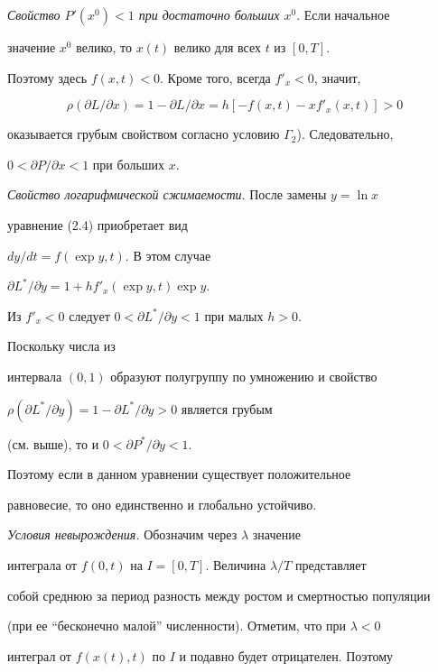  


{\it Свойство $P'(x^0)<1$ при достаточно больших $x^0$}. Если начальное 


значение $x^0$ велико, то $x(t)$ велико для всех $t$ из $[0,T]$. 


Поэтому здесь $f(x,t)<0$. Кроме того, всегда $f'_x<0$, значит, 


$$ 


\rho(\partial L/\partial x)=1-\partial L/\partial x=h[-f(x,t)-x 


f'_x(x,t)]>0 


$$ 


оказывается грубым свойством согласно условию $\Gamma_2$). Следовательно, 


$0<\partial P/\partial x<1$ при больших $x$. 


 


{\it Свойство логарифмической сжимаемости}. После замены $y=\ln x$ 


уравнение (2.4) приобретает вид


$d y/d t=f(\exp y,t)$. В этом случае 


$\partial L^*/\partial y=1+h f'_x(\exp y,t)\exp y$. 


Из $f'_x<0$ следует $0<\partial L^*/\partial y<1$ при малых $h>0$. 


Поскольку числа из 


интервала $(0,1)$ образуют полугруппу по умножению и свойство 


$\rho(\partial L^*/\partial y)=1-\partial L^*/\partial y>0$ является грубым


(см. выше), то и $0<\partial P^*/\partial y<1$. 


Поэтому если в данном уравнении существует положительное 


равновесие, то оно единственно и глобально устойчиво. 


 


{\it Условия невырождения.} Обозначим через $\lambda$ значение 


интеграла от $f(0,t)$ на $I=[0,T]$. Величина $\lambda/T$ представляет 


собой среднюю за период разность между ростом и смертностью популяции 


(при ее ``бесконечно малой'' численности). Отметим, что при $\lambda<0$ 


интеграл от $f(x(t),t)$ по $I$ и подавно будет отрицателен. Поэтому 


